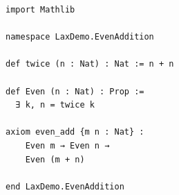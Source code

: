 \begingroup

\newsavebox{\LaxConceptBox}
\newsavebox{\LaxProofBox}

\begin{lrbox}{\LaxConceptBox}
\begin{minipage}[t]{\LaxPanelWidth}
  \vspace*{2.5mm}

\begin{lstlisting}[style=LaxConceptLean]
import Mathlib

namespace LaxDemo.EvenAddition

def twice (n : Nat) : Nat := n + n

def Even (n : Nat) : Prop :=
  ∃ k, n = twice k

axiom even_add {m n : Nat} :
    Even m → Even n →
    Even (m + n)

end LaxDemo.EvenAddition
\end{lstlisting}

  \vspace*{2.1mm}
\end{minipage}
\end{lrbox}

